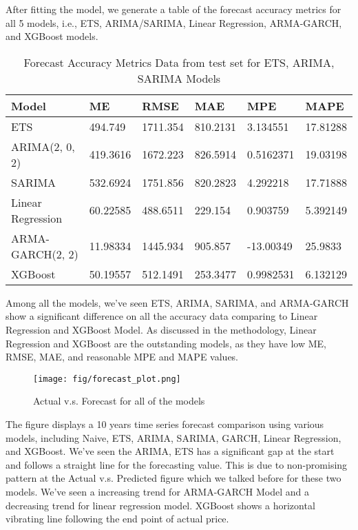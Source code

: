 \documentclass[10pt]{article}
\begin{document}
After fitting the model, we generate a table of the forecast accuracy metrics for all 5 models, i.e., ETS, ARIMA/SARIMA, Linear Regression, ARMA-GARCH, and XGBoost models.

\begin{table}[h!]
\centering
\captionsetup{font=scriptsize}
\begin{tabular}{p{2.5cm}p{2.5cm}p{2.5cm}p{2.5cm}p{2.5cm}p{2.5cm}}
\hline
\textbf{Model} & \textbf{ME} & \textbf{RMSE} & \textbf{MAE} & \textbf{MPE} & \textbf{MAPE}\\
\hline
ETS &
494.749 &
1711.354 &
810.2131 &
3.134551 &
17.81288 \\
\hline
ARIMA(2, 0, 2) &
419.3616 &
1672.223 &
826.5914 &
0.5162371 &
19.03198 \\
\hline
SARIMA &
532.6924 &
1751.856 &
820.2823 &
4.292218 &
17.71888 \\
\hline
Linear Regression &
60.22585 &
488.6511  &
229.154 &
0.903759 &
5.392149 \\
\hline
ARMA-GARCH(2, 2) &
11.98334 &
1445.934 &
905.857 &
-13.00349 &
25.9833 \\
\hline
XGBoost &
50.19557 &
512.1491 &
253.3477 &
0.9982531 &
6.132129 \\
\hline
\end{tabular}
\caption{Forecast Accuracy Metrics Data from test set for ETS, ARIMA, SARIMA Models}
\end{table}

\noindent
Among all the models, we've seen ETS, ARIMA, SARIMA, and ARMA-GARCH show a significant difference on all the accuracy data comparing to Linear Regression and XGBoost Model. As discussed in the methodology, Linear Regression and XGBoost are the outstanding models, as they have low ME, RMSE, MAE, and reasonable MPE and MAPE values. 
\begin{figure}[ht]
    \centering
    \captionsetup{font=scriptsize}
    \texttt{[image: fig/forecast\_plot.png]}
    \caption{\scriptsize Actual v.s. Forecast for all of the models}
    \label{fig:enter-label}
\end{figure}
\noindent
The figure displays a 10 years time series forecast comparison using various models, including Naive, ETS, ARIMA, SARIMA, GARCH, Linear Regression, and XGBoost. We've seen the ARIMA, ETS has a significant gap at the start and follows a straight line for the forecasting value. This is due to non-promising pattern at the Actual v.s. Predicted figure which we talked before for these two models. We've seen a increasing trend for ARMA-GARCH Model and a decreasing trend for linear regression model. XGBoost shows a horizontal vibrating line following the end point of actual price.
\end{document}
